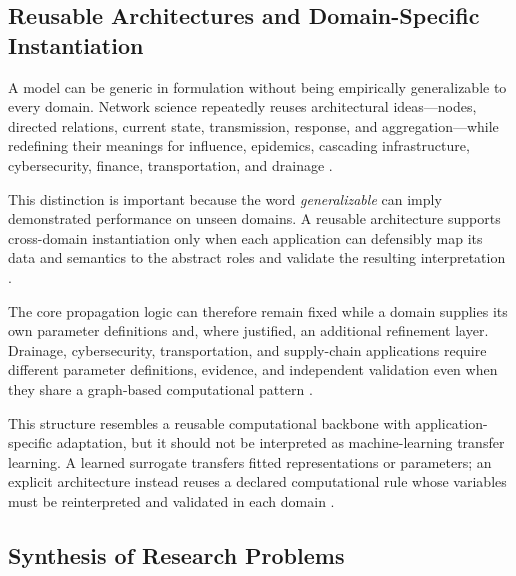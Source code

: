 



\subsection{Reusable Architectures and Domain-Specific
Instantiation}\label{generic-core-and-domain-specific-instantiation}

A model can be generic in formulation without being empirically
generalizable to every domain. Network science repeatedly reuses
architectural ideas---nodes, directed relations, current state,
transmission, response, and aggregation---while redefining their meanings
for influence, epidemics, cascading infrastructure, cybersecurity,
finance, transportation, and drainage \citep{kempe2003,kermack1927,
buldyrev2010,sheyner2002,faraji2026,petrone2018,simone2022}.

This distinction is important because the word \emph{generalizable} can
imply demonstrated performance on unseen domains. A reusable architecture
supports cross-domain instantiation only when each application can
defensibly map its data and semantics to the abstract roles and validate
the resulting interpretation \citep{kavallieratos2021,faraji2026,
petrone2018}.

The core propagation logic can therefore remain fixed while a domain
supplies its own parameter definitions and, where justified, an
additional refinement layer. Drainage, cybersecurity, transportation,
and supply-chain applications require different parameter definitions,
evidence, and independent validation even when they share a graph-based
computational pattern \citep{kavallieratos2021,zhou2023,petrone2018,
dastgir2023}.

This structure resembles a reusable computational backbone with
application-specific adaptation, but it should not be interpreted as
machine-learning transfer learning. A learned surrogate transfers fitted
representations or parameters; an explicit architecture instead reuses a
declared computational rule whose variables must be reinterpreted and
validated in each domain \citep{zhang2024}.

\subsection{Synthesis of Research
Problems}\label{synthesis-of-research-problems}

